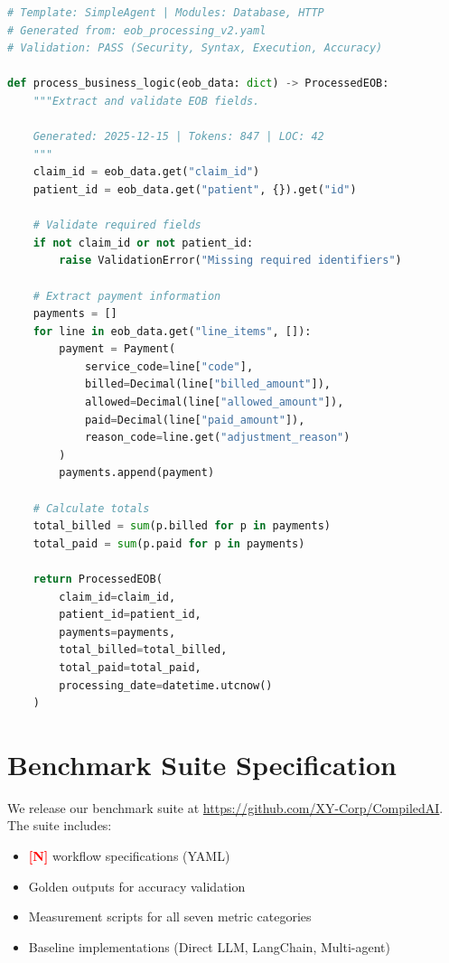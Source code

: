 \documentclass[11pt]{article}
\newcommand{\placeholder}[1]{\textcolor{red}{\textbf{[#1]}}}
\begin{document}
\begin{lstlisting}[language=Python, caption={Generated Temporal activity (business logic only)}, basicstyle=\small\ttfamily]
# Template: SimpleAgent | Modules: Database, HTTP
# Generated from: eob_processing_v2.yaml
# Validation: PASS (Security, Syntax, Execution, Accuracy)

def process_business_logic(eob_data: dict) -> ProcessedEOB:
    """Extract and validate EOB fields.
    
    Generated: 2025-12-15 | Tokens: 847 | LOC: 42
    """
    claim_id = eob_data.get("claim_id")
    patient_id = eob_data.get("patient", {}).get("id")
    
    # Validate required fields
    if not claim_id or not patient_id:
        raise ValidationError("Missing required identifiers")
    
    # Extract payment information
    payments = []
    for line in eob_data.get("line_items", []):
        payment = Payment(
            service_code=line["code"],
            billed=Decimal(line["billed_amount"]),
            allowed=Decimal(line["allowed_amount"]),
            paid=Decimal(line["paid_amount"]),
            reason_code=line.get("adjustment_reason")
        )
        payments.append(payment)
    
    # Calculate totals
    total_billed = sum(p.billed for p in payments)
    total_paid = sum(p.paid for p in payments)
    
    return ProcessedEOB(
        claim_id=claim_id,
        patient_id=patient_id,
        payments=payments,
        total_billed=total_billed,
        total_paid=total_paid,
        processing_date=datetime.utcnow()
    )
\end{lstlisting}

\section{Benchmark Suite Specification}
\label{app:benchmark}

We release our benchmark suite at \url{https://github.com/XY-Corp/CompiledAI}. The suite includes:

\begin{itemize}
    \item \placeholder{N} workflow specifications (YAML)
    \item Golden outputs for accuracy validation
    \item Measurement scripts for all seven metric categories
    \item Baseline implementations (Direct LLM, LangChain, Multi-agent)
\end{itemize}
\end{document}
